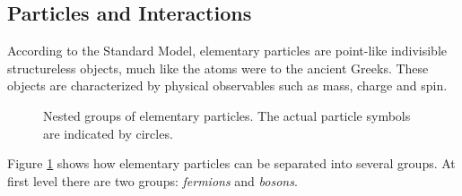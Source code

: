 \subsection{Particles and Interactions}
According to the Standard Model, elementary particles are point-like indivisible structureless objects, much like the atoms were to the ancient Greeks. These objects are characterized by physical observables such as mass, charge and spin.

\begin{figure}
    \centering
    \caption{Nested groups of elementary particles. The actual particle symbols are indicated by circles.}
    \label{fig:particle_groups}
\end{figure}

Figure \ref{fig:particle_groups} shows how elementary particles can be separated into several groups. 
At first level there are two groups: \emph{fermions} and \emph{bosons}.

